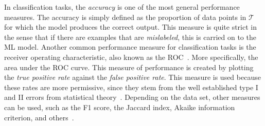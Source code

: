 In classification tasks, the \emph{accuracy} is one of the most general performance 
measures. The accuracy is simply defined as the proportion of data points in $\mathcal{T}$ 
for which the model produces the correct output. This measure is quite strict in the sense 
that if there are examples that are \emph{mislabeled}, this is carried on to the ML model.
Another common performance measure for classification tasks is the receiver operating 
characteristic, also known as the ROC~\cite{hastieElementsStatisticalLearning2009}. More 
specifically, the area under the ROC curve. This measure of performance is created by 
plotting the \emph{true positive rate} against the \emph{false positive rate}. This measure 
is used because these rates are more permissive, since they stem from the well established 
type I and II errors from statistical theory~\cite{riceMathematicalStatisticsData2006}. 
Depending on the data set, other measures can 
be used, such as the F1 score, the Jaccard index, Akaike information criterion, and 
others~\cite{murphyMachineLearningProbabilistic2012}.

